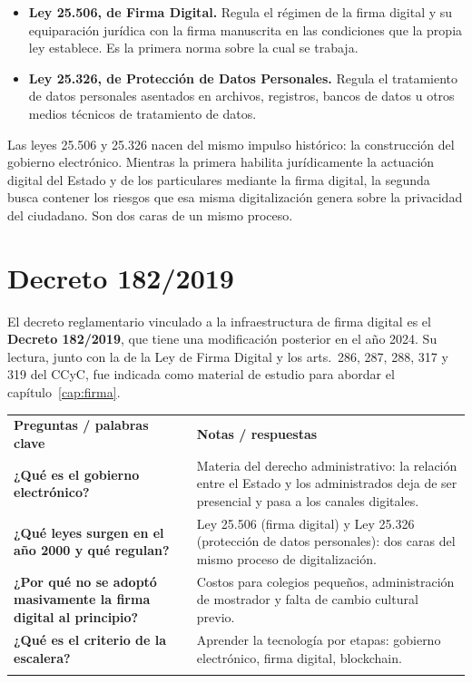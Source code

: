 \documentclass[12pt,oneside]{book}
\newcommand{\cq}[1]{\textbf{#1}}
\newcommand{\cornell}[3]{%
  \par\medskip\noindent\begingroup
  \renewcommand{\arraystretch}{1.25}%
  \begin{tabularx}{\textwidth}{|>{\raggedright\arraybackslash}p{0.27\textwidth}|>{\raggedright\arraybackslash}X|}
    \hline
    \multicolumn{2}{|>{\centering\arraybackslash}X|}{\cellcolor{azulacad!12}\textbf{Cuadro Cornell --- #1}}\\ \hline
    \cellcolor{gray!10}\textbf{Preguntas / palabras clave} & \cellcolor{gray!10}\textbf{Notas / respuestas} \\ \hline
    #2
    \multicolumn{2}{|>{\raggedright\arraybackslash}X|}{\cellcolor{azulacad!6}\textbf{Resumen.} #3}\\ \hline
  \end{tabularx}%
  \endgroup\par\medskip}
\begin{document}
\begin{itemize}
    \item \textbf{Ley 25.506, de Firma Digital.} Regula el régimen de la firma digital y su equiparación jurídica con la firma manuscrita en las condiciones que la propia ley establece. Es la primera norma sobre la cual se trabaja.
    \item \textbf{Ley 25.326, de Protección de Datos Personales.} Regula el tratamiento de datos personales asentados en archivos, registros, bancos de datos u otros medios técnicos de tratamiento de datos.
\end{itemize}

\begin{important}
Las leyes 25.506 y 25.326 nacen del mismo impulso histórico: la construcción del gobierno electrónico. Mientras la primera habilita jurídicamente la actuación digital del Estado y de los particulares mediante la firma digital, la segunda busca contener los riesgos que esa misma digitalización genera sobre la privacidad del ciudadano. Son dos caras de un mismo proceso.
\end{important}

\section{Decreto 182/2019}

El decreto reglamentario vinculado a la infraestructura de firma digital es el \textbf{Decreto 182/2019}, que tiene una modificación posterior en el año 2024. Su lectura, junto con la de la Ley de Firma Digital y los arts.~286, 287, 288, 317 y 319 del CCyC, fue indicada como material de estudio para abordar el capítulo~\ref{cap:firma}.

\cornell{Gobierno electrónico y marco normativo digital}{
\cq{¿Qué es el gobierno electrónico?} & Materia del derecho administrativo: la relación entre el Estado y los administrados deja de ser presencial y pasa a los canales digitales. \\ \hline
\cq{¿Qué leyes surgen en el año 2000 y qué regulan?} & Ley 25.506 (firma digital) y Ley 25.326 (protección de datos personales): dos caras del mismo proceso de digitalización. \\ \hline
\cq{¿Por qué no se adoptó masivamente la firma digital al principio?} & Costos para colegios pequeños, administración de mostrador y falta de cambio cultural previo. \\ \hline
\cq{¿Qué es el criterio de la escalera?} & Aprender la tecnología por etapas: gobierno electrónico, firma digital, blockchain. \\ \hline
}{El marco normativo digital argentino nace con el gobierno electrónico del año 2000: la firma digital habilita la actuación digital y la protección de datos contiene sus riesgos. Comprender ese origen es el primer escalón para estudiar firma, prueba, blockchain y tokenización.}
\end{document}

